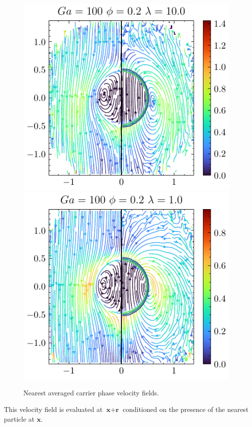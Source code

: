 \begin{figure}[h!]
    \includegraphics[height=0.4\textwidth]{image/HOMOGENEOUS_NEW/Stream/Stream_PHI_20_Ga_100_l_100}
    \includegraphics[height=0.4\textwidth]{image/HOMOGENEOUS_NEW/Stream/Stream_PHI_20_Ga_100_l_10}
    \caption{Nearest averaged carrier phase velocity fields. }
    \label{fig:stream}
\end{figure}
This velocity field is evaluated at $\textbf{x}+\textbf{r}$ conditioned on the presence of the nearest particle at $\textbf{x}$. 


